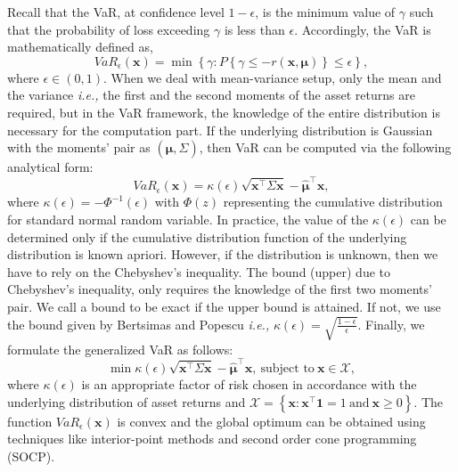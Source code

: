 \documentclass[12pt]{article}
\numberwithin{equation}{section}
\begin{document}
Recall that the VaR, at confidence level $1-\epsilon$, is the minimum value of $\gamma$ such that the probability of loss exceeding $\gamma$ is less
than $\epsilon$. Accordingly, the VaR is mathematically defined as,
\begin{equation}
VaR_{\epsilon}(\mathbf{x})=\min\left\{\gamma:P\left\{\gamma \leq -r(\mathbf{x},\boldsymbol{\mu})\right\} \leq \epsilon \right\},
\label{fig:var_basic}
\end{equation}
where $\epsilon \in (0,1)$. When we deal with mean-variance setup, only the mean and the variance \textit{i.e.,} the first and the second moments
of the asset returns are required, but in the VaR framework, the knowledge of the entire distribution is necessary for the computation part.
If the underlying distribution is Gaussian with the moments' pair as $\displaystyle\left(\hat{\boldsymbol{\mu}},\Sigma\right)$, then VaR can be computed
via the following analytical form:
\begin{equation}
VaR_{\epsilon}(\mathbf{x})=\kappa(\epsilon)\sqrt{\mathbf{x}^{\top}\Sigma \mathbf{x}}-\hat{\boldsymbol{\mu}}^{\top}\mathbf{x},
\label{eqn:kappa_eqn}
\end{equation}
where $\displaystyle{\kappa(\epsilon)=-\Phi^{-1}(\epsilon)}$ with $\Phi(z)$ representing the cumulative distribution for standard normal random variable.
In practice, the value of the $\displaystyle{\kappa(\epsilon)}$ can be determined only if the cumulative distribution function of the underlying distribution is known apriori. However, if the distribution is unknown, then we have to rely on the Chebyshev's inequality. The bound (upper) due to Chebyshev's inequality,
only requires the knowledge of the first two moments' pair. We call a bound to be exact if the upper bound is attained. If not, we use the bound given by Bertsimas and Popescu \cite{bert05} \textit{i.e.,} $\displaystyle{\kappa(\epsilon)=\sqrt{\frac{1-\epsilon}{\epsilon}}}$. Finally, we formulate the
generalized VaR as follows:
\begin{equation}
\min \kappa(\epsilon)\sqrt{\mathbf{x}^{\top}\Sigma \mathbf{x}}-\hat{\boldsymbol{\mu}}^{\top}\mathbf{x},~\text{subject to}~
\mathbf{x} \in \mathcal{X},
\label{fig:var_general}
\end{equation}
where $\displaystyle{\kappa(\epsilon)}$ is an appropriate factor of risk chosen in accordance with the underlying distribution of asset returns and
$\displaystyle{\mathcal{X}=\left\{\mathbf{x}: \mathbf{x}^{\top}\mathbf{1}=1~\text{and}~\mathbf{x} \geq 0 \right\}}$.
The function $VaR_{\epsilon}(\mathbf{x})$ is convex and the global optimum can be obtained using techniques like interior-point methods and
second order cone programming (SOCP).
\end{document}
